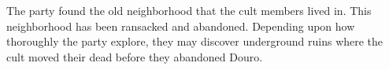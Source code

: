 The party found the old neighborhood that the cult members lived in.
This neighborhood has been ransacked and abandoned.
Depending upon how thoroughly the party explore, they may discover underground ruins where the cult moved their dead before they abandoned Douro.